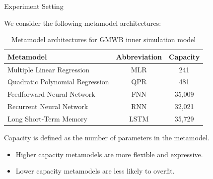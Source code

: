 \documentclass[9pt,handout]{beamer}
\begin{document}
\begin{frame}{Experiment Setting}

    We consider the following metamodel architectures:

    \begin{table}[ht!]
        \centering
        \begin{tabular}{lcc}
            \toprule
            \textbf{Metamodel} & \textbf{Abbreviation} & \textbf{Capacity} \\
            \midrule
            Multiple Linear Regression      & MLR       & 241 \\
            Quadratic Polynomial Regression & QPR       & 481 \\
            Feedforward Neural Network      & FNN       & 35,009 \\
            Recurrent Neural Network        & RNN       & 32,021 \\
            Long Short-Term Memory          & LSTM      & 35,729 \\
            \bottomrule
        \end{tabular}
        \caption{Metamodel architectures for GMWB inner simulation model}
        \label{tab:arch}
    \end{table}

    Capacity is defined as the number of parameters in the metamodel.
    \begin{itemize}
        \item   Higher capacity metamodels are more flexible and expressive.
        \item   Lower capacity metamodels are less likely to overfit.
    \end{itemize}
    
\end{frame}
\end{document}
